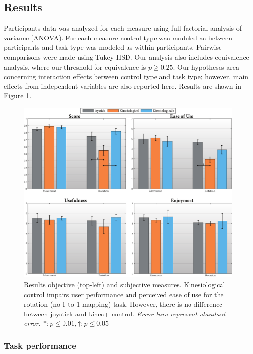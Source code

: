 \documentclass{sigchi}
\begin{document}

\subsection{Results}

Participants data was analyzed for each measure using full-factorial analysis of variance (ANOVA). For each measure control type was modeled as between participants and task type was modeled as within participants. Pairwise comparisons were made using Tukey HSD. Our analysis also includes equivalence analysis, where our threshold for equivalence is $p\geq0.25$. Our hypotheses area concerning interaction effects between control type and task type; however, main effects from independent variables are also reported here. Results are shown in Figure \ref{fig:bar_chart}.

\begin{figure}[t]
	\centering
	\includegraphics[width=\columnwidth]{figures/bar_charts.pdf}
	\caption{Results objective (top-left) and subjective measures. Kinesiological control impairs user performance and perceived ease of use for the rotation (no 1-to-1 mapping) task. However, there is no difference between joystick and kines+ control. \em{Error bars represent standard error.} $\ast: p \leq 0.01, \dagger:p \leq 0.05 $ }
	\label{fig:bar_chart}
\end{figure} 

\subsubsection{Task performance}
\end{document}
